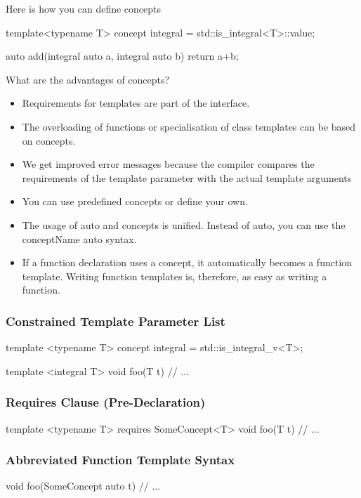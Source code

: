 \documentclass{report}
\begin{document}
\bigbreak \noindent 
Here is how you can define concepts
\bigbreak \noindent 
\begin{cppcode}
    template<typename T>
    concept integral = std::is_integral<T>::value;

    auto add(integral auto a, integral auto b) {
        return a+b;
    }
\end{cppcode}
\bigbreak \noindent 
What are the advantages of concepts?
\begin{itemize}
    \item Requirements for templates are part of the interface.
    \item The overloading of functions or specialisation of class templates can be based on concepts.
    \item We get improved error messages because the compiler compares the requirements of the template parameter with the actual template arguments
    \item You can use predefined concepts or define your own.
    \item The usage of auto and concepts is unified. Instead of auto, you can use the conceptName auto syntax.
    \item If a function declaration uses a concept, it automatically becomes a function template. Writing function templates is, therefore, as easy as writing a function.
\end{itemize}

\bigbreak \noindent 
\subsubsection{Constrained Template Parameter List}
\bigbreak \noindent 
\begin{cppcode}
template <typename T>
concept integral = std::is_integral_v<T>;

template <integral T>
void foo(T t) {
    // ...
}
\end{cppcode}

\bigbreak \noindent 
\subsubsection{Requires Clause (Pre-Declaration)}
\bigbreak \noindent 
\begin{cppcode}
template <typename T>
requires SomeConcept<T>
void foo(T t) {
    // ...
}
\end{cppcode}

\bigbreak \noindent 
\subsubsection{ Abbreviated Function Template Syntax}
\bigbreak \noindent 
\begin{cppcode}
void foo(SomeConcept auto t) {
    // ...
}
\end{cppcode}
\end{document}
